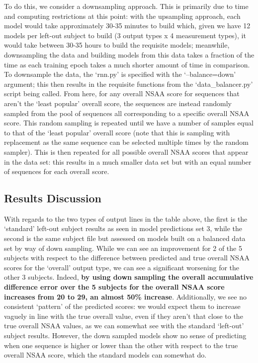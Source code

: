 \documentclass[12pt,twoside]{report}
\begin{document}
\quad To do this, we consider a downsampling approach. This is primarily due to time and computing restrictions at this point: with the upsampling approach, each model would take approximately 30-35 minutes to build which, given we have 12 models per left-out subject to build (3 output types x 4 measurement types), it would take between 30-35 hours to build the requisite models; meanwhile, downsampling the data and building models from this data takes a fraction of the time as each training epoch takes a much shorter amount of time in comparison. To downsample the data, the ‘rnn.py’ is specified with the ‘--balance=down’ argument; this then results in the requisite functions from the ‘data\_balancer.py’ script being called. From here, for any overall NSAA score for sequences that aren’t the ‘least popular’ overall score, the sequences are instead randomly sampled from the pool of sequences all corresponding to a specific overall NSAA score. This random sampling is repeated until we have a number of samples equal to that of the ‘least popular’ overall score (note that this is sampling with replacement as the same sequence can be selected multiple times by the random sampler). This is then repeated for all possible overall NSAA scores that appear in the data set: this results in a much smaller data set but with an equal number of sequences for each overall score.

\subsection{Results Discussion}

\quad With regards to the two types of output lines in the table above, the first is the ‘standard’ left-out subject results as seen in model predictions set 3, while the second is the same subject file but assessed on models built on a balanced data set by way of down sampling. While we can see an improvement for 2 of the 5 subjects with respect to the difference between predicted and true overall NSAA scores for the ‘overall’ output type, we can see a significant worsening for the other 3 subjects. Indeed, \textbf{by using down sampling the overall accumulative difference error over the 5 subjects for the overall NSAA score increases from 20 to 29, an almost 50\% increase}. Additionally, we see no consistent ‘pattern’ of the predicted scores: we would expect them to increase vaguely in line with the true overall value, even if they aren’t that close to the true overall NSAA values, as we can somewhat see with the standard ‘left-out’ subject results. However, the down sampled models show no sense of predicting when one sequence is higher or lower than the other with respect to the true overall NSAA score, which the standard models can somewhat do.\\
\end{document}
